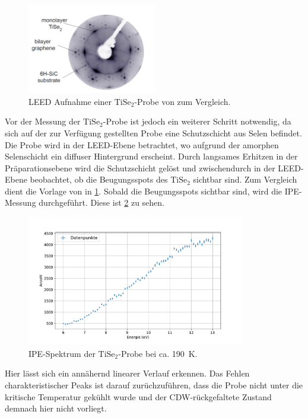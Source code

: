 \

\begin{figure}[!ht]
    \centering
    \includegraphics[width=0.5\textwidth]{img/TiSe2LEED}
    \caption{LEED Aufnahme einer $\text{TiSe}_2$-Probe von \cite{leed_sample} zum Vergleich.}
    \label{fig_leed_sample}
\end{figure}
Vor der Messung der $\text{TiSe}_2$-Probe ist jedoch ein weiterer Schritt notwendig, da sich auf der zur Verfügung gestellten Probe eine Schutzschicht aus Selen befindet.
Die Probe wird in der LEED-Ebene betrachtet, wo aufgrund der amorphen Selenschicht ein diffuser Hintergrund erscheint.
Durch langsames Erhitzen in der Präparationsebene wird die Schutzschicht gelöst und zwischendurch in der LEED-Ebene beobachtet, ob die Beugungsspots des $\text{TiSe}_2$ sichtbar sind.
Zum Vergleich dient die Vorlage von \cite{leed_sample} in \cref{fig_leed_sample}.
Sobald die Beugungsspots sichtbar sind, wird die IPE-Messung durchgeführt. %
Diese ist \cref{fig_ipe_thighs2} zu sehen.
\begin{figure}[!ht]
    \centering
    \includegraphics[width=0.85\textwidth]{plots/TiSe2.pdf}
    \caption{IPE-Spektrum der $\text{TiSe}_2$-Probe bei ca. \SI{190}{\kelvin}.}
    \label{fig_ipe_thighs2}
\end{figure}
Hier lässt sich ein annähernd linearer Verlauf erkennen.
Das Fehlen charakteristischer Peaks ist darauf zurüchzuführen, dass die Probe nicht unter die kritische Temperatur gekühlt wurde und der CDW-rückgefaltete Zustand demnach hier nicht vorliegt.

